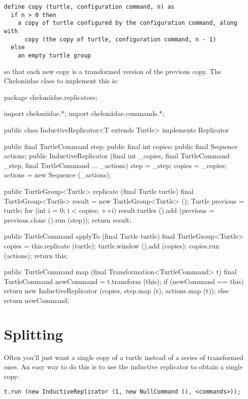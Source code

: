 \documentclass{report}
\begin{document}
\begin{verbatim}
define copy (turtle, configuration command, n) as
  if n > 0 then
    a copy of turtle configured by the configuration command, along with
      copy (the copy of turtle, configuration command, n - 1)
  else
    an empty turtle group
\end{verbatim}

      \noindent so that each new copy is a transformed version of the previous copy. The Cheloniidae class to implement this is:

\begin{javacode}
package cheloniidae.replicators;

import cheloniidae.*;
import cheloniidae.commands.*;

public class InductiveReplicator<T extends Turtle> implements Replicator {
  public final TurtleCommand step;
  public final int           copies;
  public final Sequence      actions;
  public InductiveReplicator (final int _copies, final TurtleCommand _step, final TurtleCommand ... _actions)
    {step = _step; copies = _copies; actions = new Sequence (_actions);}

  public TurtleGroup<Turtle> replicate (final Turtle turtle) {
    final TurtleGroup<Turtle> result   = new TurtleGroup<Turtle> ();
    Turtle                    previous = turtle;
    for (int i = 0; i < copies; ++i) result.turtles ().add (previous = previous.clone ().run (step));
    return result;
  }

  public TurtleCommand applyTo (final Turtle turtle) {
    final TurtleGroup<Turtle> copies = this.replicate (turtle);
    turtle.window ().add (copies);
    copies.run (actions);
    return this;
  }

  public TurtleCommand map (final Transformation<TurtleCommand> t) {
    final TurtleCommand newCommand = t.transform (this);
    if (newCommand == this) return new InductiveReplicator (copies, step.map (t), actions.map (t));
    else                    return newCommand;
  }
}
\end{javacode}

\section {Splitting} \label{sec:splitting}
      Often you'll just want a single copy of a turtle instead of a series of transformed ones. An easy way to do this is to use the inductive replicator to
      obtain a single copy:

\begin{verbatim}
t.run (new InductiveReplicator (1, new NullCommand (), <commands>));
\end{verbatim}
\end{document}
